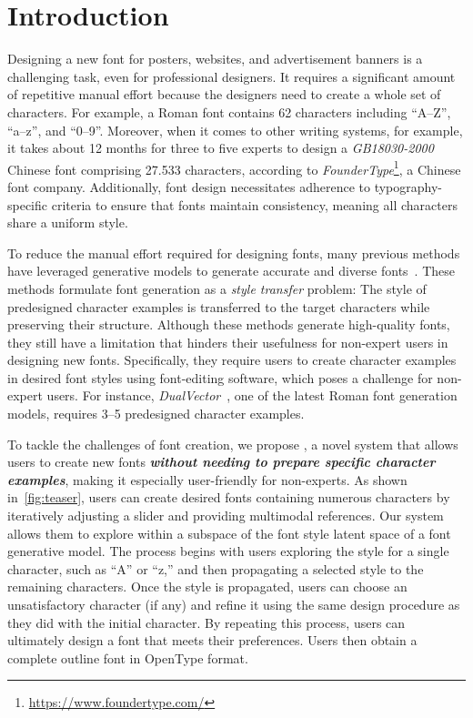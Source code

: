 \section{Introduction}
\label{introduction}
Designing a new font for posters, websites, and advertisement banners is a challenging task, even for professional designers.
It requires a significant amount of repetitive manual effort because the designers need to create a whole set of characters.
For example, a Roman font contains \num{62} characters including ``A--Z'', ``a--z'', and ``0--9''.
Moreover, when it comes to other writing systems, for example, it takes about \num{12} months for three to five experts to design a \textit{GB18030-2000} Chinese font comprising \num{27,533} characters, according to \textit{FounderType}\footnote{\url{https://www.foundertype.com/}}, a Chinese font company.
Additionally, font design necessitates adherence to typography-specific criteria to ensure that fonts maintain consistency, meaning all characters share a uniform style.

To reduce the manual effort required for designing fonts, many previous methods have leveraged generative models to generate accurate and diverse fonts~\cite{YuchenRewrite2016, YuchenZi2zi2017, UpchurchA2Z2016, liu2023dualvector, xia2023vecfontsdf, wang2021deepvecfont, wang2023deepvecfontv2, thamizharasan2024vecfusion, JiangDCFont2017, XieDGFont2021, ZhangEMD2018, liu2024qtfont, yang2024fontdiffuser}.
These methods formulate font generation as a \emph{style transfer} problem: The style of predesigned character examples is transferred to the target characters while preserving their structure.
Although these methods generate high-quality fonts, they still have a limitation that hinders their usefulness for non-expert users in designing new fonts.
Specifically, they require users to create character examples in desired font styles using font-editing software, which poses a challenge for non-expert users.
For instance, \textit{DualVector}~\cite{liu2023dualvector}, one of the latest Roman font generation models, requires \num{3}--\num{5} predesigned character examples.


To tackle the challenges of font creation, we propose \systemName, a novel system that allows users to create new fonts \emph{\textbf{without needing to prepare specific character examples}}, making it especially user-friendly for non-experts.
As shown in~\autoref{fig:teaser}, users can create desired fonts containing numerous characters by iteratively adjusting a slider and providing multimodal references.
Our system allows them to explore within a subspace of the font style latent space of a font generative model.
The process begins with users exploring the style for a single character, such as ``A'' or ``z,'' and then propagating a selected style to the remaining characters.
Once the style is propagated, users can choose an unsatisfactory character (if any) and refine it using the same design procedure as they did with the initial character.
By repeating this process, users can ultimately design a font that meets their preferences.
Users then obtain a complete outline font in OpenType format.

